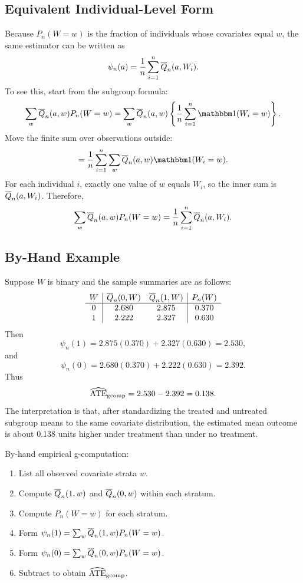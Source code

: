 \subsection{Equivalent Individual-Level Form}

Because $P_n(W=w)$ is the fraction of individuals whose covariates equal $w$, the
same estimator can be written as
\[
\psi_n(a)
=
\frac{1}{n}\sum_{i=1}^n \overline{Q}_n(a,W_i).
\]
To see this, start from the subgroup formula:
\[
\sum_w \Qbar_n(a,w)P_n(W=w)
=
\sum_w \Qbar_n(a,w)
\left\{
\frac{1}{n}\sum_{i=1}^n \ind(W_i=w)
\right\}.
\]
Move the finite sum over observations outside:
\[
=
\frac{1}{n}\sum_{i=1}^n
\sum_w \Qbar_n(a,w)\ind(W_i=w).
\]
For each individual $i$, exactly one value of $w$ equals $W_i$, so the inner sum is
$\overline{Q}_n(a,W_i)$. Therefore,
\[
\sum_w \overline{Q}_n(a,w)P_n(W=w)
=
\frac{1}{n}\sum_{i=1}^n \overline{Q}_n(a,W_i).
\]

\subsection{By-Hand Example}

Suppose $W$ is binary and the sample summaries are as follows:
\[
\begin{array}{c|cc|c}
W & \overline{Q}_n(0,W) & \overline{Q}_n(1,W) & P_n(W)\\
\hline
0 & 2.680 & 2.875 & 0.370\\
1 & 2.222 & 2.327 & 0.630
\end{array}
\]
Then
\[
\psi_n(1)=2.875(0.370)+2.327(0.630)=2.530,
\]
and
\[
\psi_n(0)=2.680(0.370)+2.222(0.630)=2.392.
\]
Thus
\[
\widehat{\operatorname{ATE}}_{\mathrm{gcomp}}=2.530-2.392=0.138.
\]
The interpretation is that, after standardizing the treated and untreated subgroup
means to the same covariate distribution, the estimated mean outcome is about 0.138 units
higher under treatment than under no treatment.

\begin{estimationbox}
By-hand empirical g-computation:
\begin{enumerate}
\item List all observed covariate strata $w$.
\item Compute $\overline{Q}_n(1,w)$ and $\overline{Q}_n(0,w)$ within each stratum.
\item Compute $P_n(W=w)$ for each stratum.
\item Form $\psi_n(1)=\sum_w \overline{Q}_n(1,w)P_n(W=w)$.
\item Form $\psi_n(0)=\sum_w \overline{Q}_n(0,w)P_n(W=w)$.
\item Subtract to obtain $\widehat{\operatorname{ATE}}_{\mathrm{gcomp}}$.
\end{enumerate}
\end{estimationbox}
